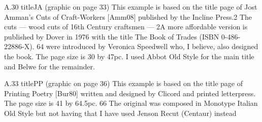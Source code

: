 A.30 titleJA (graphic on page 33)
This example is based on the title page of Jost Amman’s Cuts of Craft-Workers [Amm08]
published by the Incline Press.2 The cuts — wood cuts of 16th Century craftsmen —
2A more affordable version is published by Dover in 1976 with the title The Book of
Trades (ISBN 0-486-22886-X).
64
were introduced by Veronica Speedwell who, I believe, also designed the book. The
page size is 30 by 47pc.
I used Abbot Old Style for the main title and Belwe for the remainder.
\newcommand*{\titleJA}{\begingroup%
\FSfont{5bl}%
\begin{center}
\drop=0.2\textheight
\vspace*{0.5\drop}
\Large THE AUTHOR’S \\[\baselineskip]
{\FSfont{5at}%
\huge\textcolor{Red}{Some Conundrums}}\\[2\baselineskip]
\large \textit{with an intruction by} \\
SOMEONE ELSE\par
\vfill
YEAR \\
{\color{Red} \rule{\txtwidth}{0.4pt}\vspace*{-\baselineskip}\vspace{3pt}
\rule{\txtwidth}{0.4pt}} \\[\baselineskip]
\Large THE PUBLISHER
\end{center}
\vspace*{\drop}
\mbox{}
\endgroup}

A.33 titlePP (graphic on page 36)
This example is based on the title page of Printing Poetry [Bur80] written and designed
by Clicord and printed letterpress. The page size is 41 by 64.5pc.
66
The original was composed in Monotype Italian Old Style but not having that I have
used Jenson Recut (Centaur) instead
\newcommand*{\titlePP}{\begingroup%
\FSfont{5jr}%
\drop=0.1\textheight
\vspace*{\drop}
\begin{raggedleft}
{\HUGE PUZZLING}\\[\baselineskip]
{A WORKBOOK FOR RESOLUTIONS}\\[1.1\baselineskip]
{\HUGE CONUNDRUMS} \\[\baselineskip]
{\Large BY THE AUTHOR}\par
\end{raggedleft}
\vfill
\begin{center}
{\large THE PUBLISHER YEAR}
\end{center}
\vspace*{\drop}
\endgroup}

